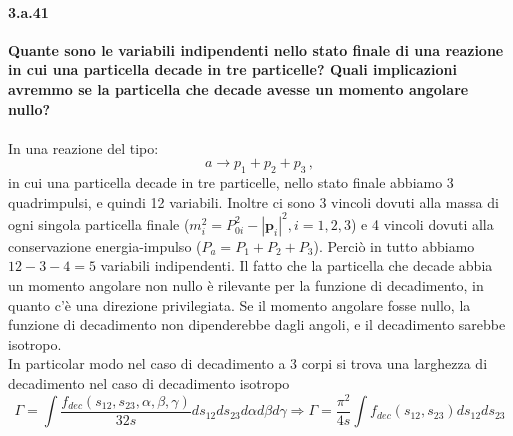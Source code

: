 \documentclass[twoside]{article}
\begin{document}
\paragraph{3.a.41}\textbf{Quante sono le variabili indipendenti nello stato finale di una reazione in cui una particella decade in tre particelle? Quali implicazioni avremmo se la particella che decade avesse un momento angolare nullo?}\\\\
In una reazione del tipo:
\begin{equation}
a \longrightarrow p_1+p_2+p_3 \, ,
\end{equation}
in cui una particella decade in tre particelle, nello stato finale abbiamo 3 quadrimpulsi, e quindi 12 variabili. Inoltre ci sono 3 vincoli dovuti alla massa di ogni singola particella finale ($m_i^2=P_{0i}^2-|\mathbf{p}_i|^2 , i=1,2,3$) e 4 vincoli dovuti alla conservazione energia-impulso ($P_a=P_1+P_2+P_3$). Perciò in tutto abbiamo $12-3-4=5$ variabili indipendenti. Il fatto che la particella che decade abbia un momento angolare non nullo è rilevante per la funzione di decadimento, in quanto c'è una direzione privilegiata. Se il momento angolare fosse nullo, la funzione di decadimento non dipenderebbe dagli angoli, e il decadimento sarebbe isotropo.\\
In particolar modo nel caso di decadimento a 3 corpi si trova una larghezza di decadimento nel caso di decadimento isotropo
\begin{equation}
    \Gamma=\int \frac{f_{dec}(s_{12},s_{23},\alpha,\beta,\gamma)}{32s}ds_{12} ds_{23} d\alpha d\beta d\gamma \Longrightarrow \Gamma=\frac{\pi^2}{4s}\int f_{dec}(s_{12},s_{23})ds_{12}ds_{23}
\end{equation}
\end{document}
